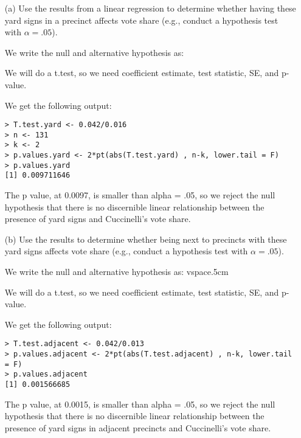 \documentclass[12pt,letterpaper]{article}
\begin{document}
\vspace{.5cm}
\begin{enumerate}
	\item [(a)] Use the results from a linear regression to determine whether having these yard signs in a precinct affects vote share (e.g., conduct a hypothesis test with $\alpha = .05$).

\noindent We write the null and alternative hypothesis as:
\vspace{.5cm}
  
\vspace{.5cm}   
\noindent We will do a t.test, so we need coefficient estimate, test statistic, SE, and p-value.
\vspace{.5cm}
  
\vspace{.5cm}   
\noindent We get the following output:
\begin{verbatim}
> T.test.yard <- 0.042/0.016
> n <- 131
> k <- 2
> p.values.yard <- 2*pt(abs(T.test.yard) , n-k, lower.tail = F)
> p.values.yard
[1] 0.009711646
\end{verbatim}
\noindent The p value, at 0.0097, is smaller than alpha = .05, so we reject the null hypothesis that there is no discernible linear relationship between the presence of yard signs and Cuccinelli's vote share.
	
	\item [(b)]  Use the results to determine whether being
	next to precincts with these yard signs affects vote
	share (e.g., conduct a hypothesis test with $\alpha = .05$).

\noindent We write the null and alternative hypothesis as:
vspace{.5cm}
  
\vspace{.5cm}  
\noindent We will do a t.test, so we need coefficient estimate, test statistic, SE, and p-value.
\vspace{.5cm}
  
\vspace{.5cm}   
\noindent We get the following output:
\begin{verbatim}
> T.test.adjacent <- 0.042/0.013
> p.values.adjacent <- 2*pt(abs(T.test.adjacent) , n-k, lower.tail = F)
> p.values.adjacent
[1] 0.001566685
\end{verbatim}
\noindent The p value, at 0.0015, is smaller than alpha = .05, so we reject the null hypothesis that there is no discernible linear relationship between the presence of yard signs in adjacent precincts and Cuccinelli's vote share.
	

\end{enumerate}
\end{document}
